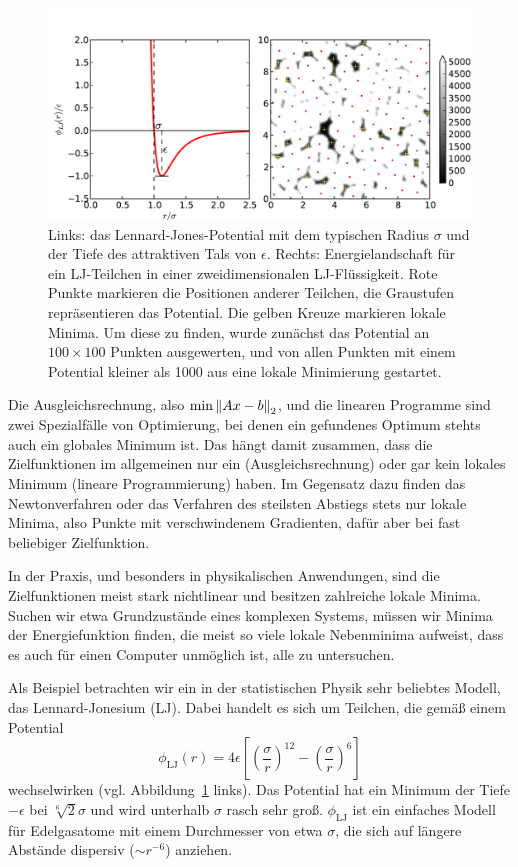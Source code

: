 \begin{figure}
  \centering
  \includegraphics[width=\textwidth]{plots/lj}
  \caption{Links: das Lennard-Jones-Potential mit dem typischen Radius
    $\sigma$ und der Tiefe des attraktiven Tals von
    $\epsilon$. Rechts: Energielandschaft für ein LJ-Teilchen in einer
    zweidimensionalen LJ-Flüssigkeit. Rote Punkte markieren die
    Positionen anderer Teilchen, die Graustufen repräsentieren das
    Potential. Die gelben Kreuze markieren lokale Minima. Um diese zu
    finden, wurde zunächst das Potential an $100\times 100$ Punkten
    ausgewerten, und von allen Punkten mit einem Potential kleiner als
    1000 aus eine lokale Minimierung gestartet.}
  \label{fig:ljminima}
\end{figure}

Die Ausgleichsrechnung, also $\min \left\lVert{Ax-b}\right\rVert_2$, und die linearen
Programme sind zwei Spezialfälle von Optimierung, bei denen ein
gefundenes Optimum stehts auch ein globales Minimum ist. Das hängt
damit zusammen, dass die Zielfunktionen im allgemeinen nur ein
(Ausgleichsrechnung) oder gar kein lokales Minimum (lineare
Programmierung) haben. Im Gegensatz dazu finden das Newtonverfahren
oder das Verfahren des steilsten Abstiegs stets nur lokale Minima,
also Punkte mit verschwindenem Gradienten, dafür aber bei fast
beliebiger Zielfunktion.

In der Praxis, und besonders in physikalischen Anwendungen, sind die
Zielfunktionen meist stark nichtlinear und besitzen zahlreiche lokale
Minima. Suchen wir etwa Grundzustände eines komplexen Systems, müssen
wir Minima der Energiefunktion finden, die meist so viele lokale
Nebenminima aufweist, dass es auch für einen Computer unmöglich ist,
alle zu untersuchen.

Als Beispiel betrachten wir ein in der statistischen Physik sehr
beliebtes Modell, das Lennard-Jonesium (LJ). Dabei handelt es sich um
Teilchen, die gemäß einem Potential
\begin{equation}
  \phi_{\text{LJ}}(r) = 4\epsilon\left[\left(\frac{\sigma}{r}\right)^{12} -
    \left(\frac{\sigma}{r}\right)^{6}\right]
\end{equation}
wechselwirken (vgl. Abbildung~\ref{fig:ljminima} links). Das Potential
hat ein Minimum der Tiefe $-\epsilon$ bei $\sqrt[6]{2}\sigma$ und wird
unterhalb $\sigma$ rasch sehr groß. $\phi_{\text{LJ}}$ ist ein
einfaches Modell für Edelgasatome mit einem Durchmesser von etwa
$\sigma$, die sich auf längere Abstände dispersiv ($\sim r^{-6}$)
anziehen.


